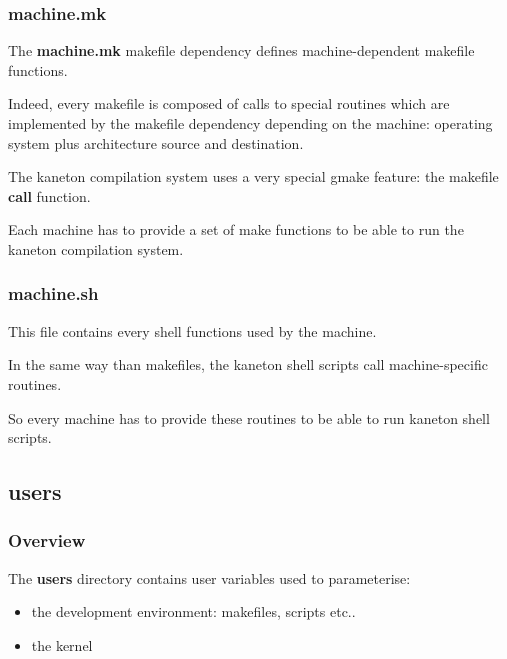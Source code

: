 {%

\begin{frame}
  \frametitle{machine.mk}

  The \textbf{machine.mk} makefile dependency defines machine-dependent
  makefile functions.

  \nl

  Indeed, every makefile is composed of calls to special routines
  which are implemented by the makefile dependency depending on the
  machine: operating system plus architecture source and destination.

  \nl

  The kaneton compilation system uses a very special gmake feature:
  the makefile \textbf{call} function.

  \nl

  Each machine has to provide a set of make functions to be able to run
  the kaneton compilation system.
\end{frame}


\begin{frame}
  \frametitle{machine.sh}

  This file contains every shell functions used by the machine.

  \nl

  In the same way than makefiles, the kaneton shell scripts call
  machine-specific routines.

  \nl

  So every machine has to provide these routines to be able to run
  kaneton shell scripts.
\end{frame}

%
%

\subsection{users}


\begin{frame}
  \frametitle{Overview}

  The \textbf{users} directory contains user variables used to parameterise:

  \begin{itemize}
    \item
      the development environment: makefiles, scripts etc..
    \item
      the kernel
  \end{itemize}


\end{frame}}
